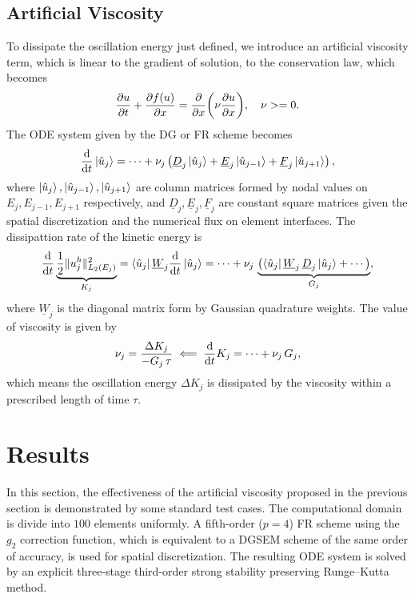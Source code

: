 \documentclass[10pt]{article}
\begin{document}
\subsection{Artificial Viscosity}
To dissipate the oscillation energy just defined, we introduce an artificial viscosity term, which is linear to the gradient of solution, to the conservation law, which becomes
$$
\pdv{u}{t}+\pdv{f(u)}{x}=\pdv{x}\qty(\nu\pdv{u}{x}),\quad \nu >= 0.
$$
The ODE system given by the DG or FR scheme becomes
$$
\dv{t}\ket{\hat{u}_{j}}=\cdots+\nu_{j}\left(\underline{D}_{j}\ket{\hat{u}_{j}}+\underline{E}_{j}\ket{\hat{u}_{j-1}}+\underline{F}_{j}\ket{\hat{u}_{j+1}}\right),
$$
where $\ket{\hat{u}_{j}}, \ket{\hat{u}_{j-1}}, \ket{\hat{u}_{j+1}}$ are column matrices formed by nodal values on $E_{j}, E_{j-1}, E_{j+1}$ respectively, and $ \underline{D}_{j}, \underline{E}_{j}, \underline{F}_{j} $ are constant square matrices given the spatial discretization and the numerical flux on element interfaces.
The dissipattion rate of the kinetic energy is
$$
\dv{t}\underbrace{\frac{1}{2}\Vert u_{j}^{h}\Vert_{L_{2}(E_{j})}^{2}}_{K_{j}}=\bra{\hat{u}_{j}}\underline{W}_{j}\dv{t}\ket{\hat{u}_{j}}=\cdots+\nu_{j}\,\underbrace{\left(\bra{\hat{u}_{j}}\underline{W}_{j}\,\underline{D}_{j}\ket{\hat{u}_{j}}+\cdots\right)}_{G_{j}},
$$
where $\underline{W}_{j}$ is the diagonal matrix form by Gaussian quadrature weights.
The value of viscosity is given by
$$
\nu_{j}=\frac{\Delta K_{j}}{-G_{j}\,\tau}\impliedby\dv{t}K_{j}=\cdots+\nu_{j}\,G_{j},
$$
which means the oscillation energy $\Delta K_{j}$ is dissipated by the viscosity within a prescribed length of time $\tau$.

\section{Results}
In this section, the effectiveness of the artificial viscosity proposed in the previous section is demonstrated by some standard test cases.
The computational domain is divide into $100$ elements uniformly.
A fifth-order ($p=4$) FR scheme using the $g_2$ correction function, which is equivalent to a DGSEM scheme of the same order of accuracy, is used for spatial discretization.
The resulting ODE system is solved by an explicit three-stage third-order strong stability preserving Runge--Kutta method.
\end{document}
